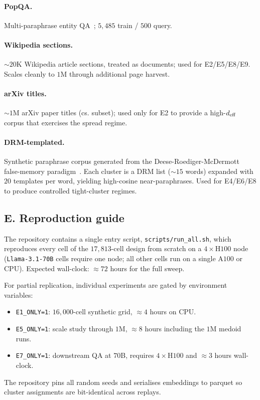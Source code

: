 \paragraph{PopQA.} Multi-paraphrase entity QA~\cite{mallen2023popqa};
$5{,}485$ train / $500$ query.

\paragraph{Wikipedia sections.} $\sim 20$K Wikipedia article
sections, treated as documents; used for E2/E5/E8/E9. Scales
cleanly to $1$M through additional page harvest.

\paragraph{arXiv titles.} $\sim 1$M arXiv paper titles (cs.\*
subset); used only for E2 to provide a high-${d_{\mathrm{eff}}}$ corpus that
exercises the spread regime.

\paragraph{DRM-templated.} Synthetic paraphrase corpus generated
from the Deese-Roediger-McDermott false-memory
paradigm~\cite{roediger1995drm}. Each cluster is a DRM list
($\sim 15$ words) expanded with $20$ templates per word, yielding
high-cosine near-paraphrases. Used for E4/E6/E8 to produce
controlled tight-cluster regimes.

\subsection*{E. Reproduction guide}
\label{sec:methods:reproduce}

The repository contains a single entry script,
\texttt{scripts/run\_all.sh}, which reproduces every cell of the
$17{,}813$-cell design from scratch on a $4\times$H$100$ node
(\texttt{Llama-3.1-70B} cells require one node; all other cells run
on a single A$100$ or CPU). Expected wall-clock: $\approx 72$ hours
for the full sweep.

For partial replication, individual experiments are gated by
environment variables:
\begin{itemize}[leftmargin=1.8em, itemsep=2pt]
\item \texttt{E1\_ONLY=1}: $16{,}000$-cell synthetic grid,
$\approx 4$ hours on CPU.
\item \texttt{E5\_ONLY=1}: scale study through $1$M,
$\approx 8$ hours including the $1$M medoid runs.
\item \texttt{E7\_ONLY=1}: downstream QA at $70$B, requires
$4\times$H$100$ and $\approx 3$ hours wall-clock.
\end{itemize}

The repository pins all random seeds and serialises embeddings to
parquet so cluster assignments are bit-identical across replays.
